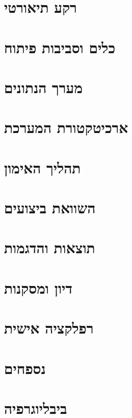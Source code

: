 \documentclass[12pt, a4paper]{article}
\begin{document}
\section{רקע תיאורטי}

\section{כלים וסביבות פיתוח}

\section{מערך הנתונים}

\section{ארכיטקטורת המערכת}

\section{תהליך האימון}

\section{השוואת ביצועים}

\section{תוצאות והדגמות}

\section{דיון ומסקנות}

\section{רפלקציה אישית}


\newpage
\appendix

\section{נספחים}


\newpage

\section{ביבליוגרפיה}

\end{document}
